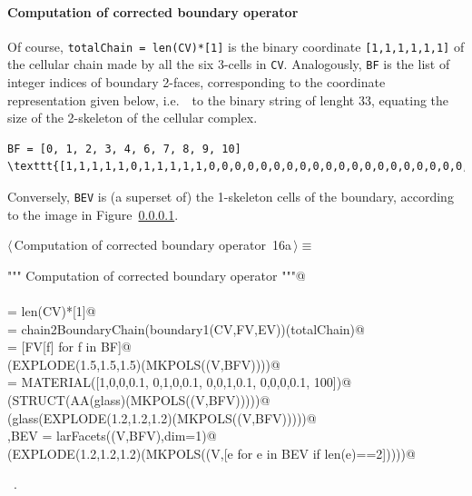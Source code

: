 \documentclass[11pt,oneside]{article}	%
\begin{document}
\paragraph{Computation of corrected boundary operator}
Of course, \texttt{totalChain = len(CV)*[1]} is the binary coordinate \texttt{[1,1,1,1,1,1]}
of the cellular chain made by all the six 3-cells in \texttt{CV}.
Analogously, \texttt{BF} is the list of integer indices of boundary 2-faces, corresponding to the coordinate representation given below, i.e.~~to the binary string of lenght 33, equating the size of the 2-skeleton of the cellular complex.
\begin{verbatim}
BF = [0, 1, 2, 3, 4, 6, 7, 8, 9, 10]
\texttt{[1,1,1,1,1,0,1,1,1,1,1,0,0,0,0,0,0,0,0,0,0,0,0,0,0,0,0,0,0,0,0,0,0]}
\end{verbatim}
Conversely, \texttt{BEV} is (a superset of) the 1-skeleton cells of the boundary, according to the image in Figure~\ref{}.

\begin{flushleft} \small \label{scrap25}
\protect{}$\langle\,$Computation of corrected boundary operator\nobreak\ {\footnotesize 16a}$\,\rangle\equiv$
\vspace{-1ex}
\begin{list}{}{} \item
\mbox{}\verb@""" Computation of corrected boundary operator """@\\
\mbox{}\verb@@\\
\mbox{}\verb@totalChain = len(CV)*[1]@\\
\mbox{}\verb@BF = chain2BoundaryChain(boundary1(CV,FV,EV))(totalChain)@\\
\mbox{}\verb@BFV = [FV[f] for f in BF]@\\
\mbox{}\verb@VIEW(EXPLODE(1.5,1.5,1.5)(MKPOLS((V,BFV))))@\\
\mbox{}\verb@glass = MATERIAL([1,0,0,0.1,  0,1,0,0.1,  0,0,1,0.1, 0,0,0,0.1, 100])@\\
\mbox{}\verb@VIEW(STRUCT(AA(glass)(MKPOLS((V,BFV)))))@\\
\mbox{}\verb@VIEW(glass(EXPLODE(1.2,1.2,1.2)(MKPOLS((V,BFV)))))@\\
\mbox{}\verb@V,BEV = larFacets((V,BFV),dim=1)@\\
\mbox{}\verb@VIEW(EXPLODE(1.2,1.2,1.2)(MKPOLS((V,[e for e in BEV if len(e)==2]))))@\\
\mbox{}\verb@@{\NWsep}
\end{list}
\vspace{-1ex}
\footnotesize\addtolength{\baselineskip}{-1ex}
\begin{list}{}{\setlength{\itemsep}{-\parsep}\setlength{\itemindent}{-\leftmargin}}
\item \NWtxtMacroRefIn\ .
\end{list}
\end{flushleft}
\end{document}
